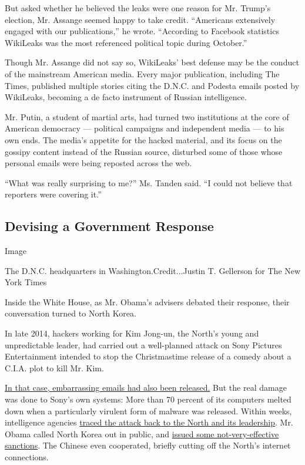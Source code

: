 But asked whether he believed the leaks were one reason for Mr. Trump's
election, Mr. Assange seemed happy to take credit. ``Americans
extensively engaged with our publications,'' he wrote. ``According to
Facebook statistics WikiLeaks was the most referenced political topic
during October.''

Though Mr. Assange did not say so, WikiLeaks' best defense may be the
conduct of the mainstream American media. Every major publication,
including The Times, published multiple stories citing the D.N.C. and
Podesta emails posted by WikiLeaks, becoming a de facto instrument of
Russian intelligence.

Mr. Putin, a student of martial arts, had turned two institutions at the
core of American democracy --- political campaigns and independent media
--- to his own ends. The media's appetite for the hacked material, and
its focus on the gossipy content instead of the Russian source,
disturbed some of those whose personal emails were being reposted across
the web.

``What was really surprising to me?'' Ms. Tanden said. ``I could not
believe that reporters were covering it.''

\hypertarget{devising-a-government-response}{%
\subsection{Devising a Government
Response}\label{devising-a-government-response}}

Image

The D.N.C. headquarters in Washington.Credit...Justin T. Gellerson for
The New York Times

Inside the White House, as Mr. Obama's advisers debated their response,
their conversation turned to North Korea.

In late 2014, hackers working for Kim Jong-un, the North's young and
unpredictable leader, had carried out a well-planned attack on Sony
Pictures Entertainment intended to stop the Christmastime release of a
comedy about a C.I.A. plot to kill Mr. Kim.

\href{https://www.nytimes3xbfgragh.onion/2014/12/31/business/media/sony-attack-first-a-nuisance-swiftly-grew-into-a-firestorm-.html?_r=0}{In
that case, embarrassing emails had also been released.} But the real
damage was done to Sony's own systems: More than 70 percent of its
computers melted down when a particularly virulent form of malware was
released. Within weeks, intelligence agencies
\href{https://www.nytimes3xbfgragh.onion/2014/12/31/business/media/sony-attack-first-a-nuisance-swiftly-grew-into-a-firestorm-.html?_r=0}{traced
the attack back to the North and its leadership}. Mr. Obama called North
Korea out in public, and
\href{https://www.nytimes3xbfgragh.onion/2015/01/03/us/in-response-to-sony-attack-us-levies-sanctions-on-10-north-koreans.html}{issued
some not-very-effective sanctions}. The Chinese even cooperated, briefly
cutting off the North's internet connections.

